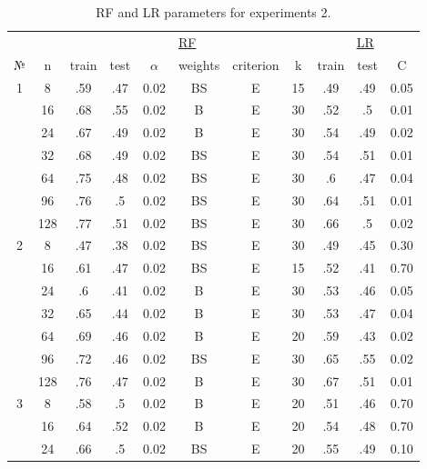\begin{table}
\centering
\caption{RF and LR parameters for experiments 2.}
\label{tab:params_2_rf_lr}
\begin{tabular}{|c|c|cccccc||ccc|}\hline
& & \multicolumn{6}{c||}{\underline{RF}} & \multicolumn{3}{c|}{\underline{LR}}\\
№ &   n & train & test & $\alpha$ & weights & criterion &  k & train & test &    C \\\hline
1 &   8 &   .59 &  .47 &     0.02 &      BS &         E & 15 &   .49 &  .49 & 0.05 \\
  &  16 &   .68 &  .55 &     0.02 &       B &         E & 30 &   .52 &   .5 & 0.01 \\
  &  24 &   .67 &  .49 &     0.02 &       B &         E & 30 &   .54 &  .49 & 0.02 \\
  &  32 &   .68 &  .49 &     0.02 &      BS &         E & 30 &   .54 &  .51 & 0.01 \\
  &  64 &   .75 &  .48 &     0.02 &      BS &         E & 30 &    .6 &  .47 & 0.04 \\
  &  96 &   .76 &   .5 &     0.02 &      BS &         E & 30 &   .64 &  .51 & 0.01 \\
  & 128 &   .77 &  .51 &     0.02 &      BS &         E & 30 &   .66 &   .5 & 0.02 \\\hline
2 &   8 &   .47 &  .38 &     0.02 &      BS &         E & 30 &   .49 &  .45 & 0.30 \\
  &  16 &   .61 &  .47 &     0.02 &      BS &         E & 15 &   .52 &  .41 & 0.70 \\
  &  24 &    .6 &  .41 &     0.02 &       B &         E & 30 &   .53 &  .46 & 0.05 \\
  &  32 &   .65 &  .44 &     0.02 &       B &         E & 30 &   .53 &  .47 & 0.04 \\
  &  64 &   .69 &  .46 &     0.02 &       B &         E & 20 &   .59 &  .43 & 0.02 \\
  &  96 &   .72 &  .46 &     0.02 &      BS &         E & 30 &   .65 &  .55 & 0.02 \\
  & 128 &   .76 &  .47 &     0.02 &       B &         E & 30 &   .67 &  .51 & 0.01 \\\hline
3 &   8 &   .58 &   .5 &     0.02 &       B &         E & 20 &   .51 &  .46 & 0.70 \\
  &  16 &   .64 &  .52 &     0.02 &       B &         E & 20 &   .54 &  .48 & 0.70 \\
  &  24 &   .66 &   .5 &     0.02 &      BS &         E & 20 &   .55 &  .49 & 0.10 \\

\end{tabular}
\end{table}
